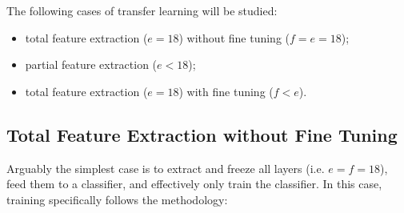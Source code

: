 The following cases of transfer learning will be studied:

\begin{itemize}
    \item total feature extraction ($e = 18$) without fine tuning ($f = e = 18$);
    \item partial feature extraction ($e < 18$);
    \item total feature extraction ($e = 18$) with fine tuning ($f < e$).
\end{itemize}

\subsection{Total Feature Extraction without Fine Tuning}

Arguably the simplest case is to extract and freeze all layers (i.e. $e = f = 18$), feed them to a classifier, and effectively only train the classifier. In this case, training specifically follows the methodology:

